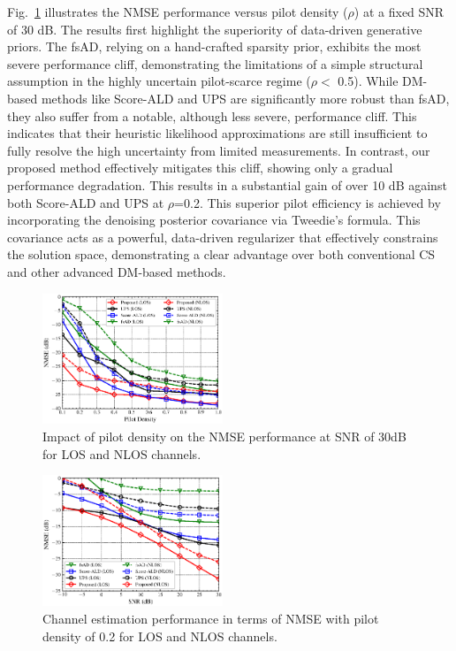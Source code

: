 \documentclass[lettersize,journal]{IEEEtran}
\begin{document}
Fig.~\ref{fig_sim_1} illustrates the NMSE performance versus pilot density ($\rho$) at a fixed SNR of 30 dB. The results first highlight the superiority of data-driven generative priors. The fsAD, relying on a hand-crafted sparsity prior, exhibits the most severe performance cliff, demonstrating the limitations of a simple structural assumption in the highly uncertain pilot-scarce regime ($\rho<$ 0.5).
While DM-based methods like Score-ALD and UPS are significantly more robust than fsAD, they also suffer from a notable, although less severe, performance cliff. This indicates that their heuristic likelihood approximations are still insufficient to fully resolve the high uncertainty from limited measurements.
In contrast, our proposed method effectively mitigates this cliff, showing only a gradual performance degradation. This results in a substantial gain of over 10 dB against both Score-ALD and UPS at $\rho$=0.2. This superior pilot efficiency is achieved by incorporating the denoising posterior covariance via Tweedie's formula. This covariance acts as a powerful, data-driven regularizer that effectively constrains the solution space, demonstrating a clear advantage over both conventional CS and other advanced DM-based methods.

\begin{figure}[!t]
\includegraphics[width=0.48\textwidth]{images/20251014/fig_1.eps}
\caption{Impact of pilot density on the NMSE performance at SNR of 30dB for LOS and NLOS channels.}
\label{fig_sim_1}
\end{figure}

\begin{figure}[!t]
\includegraphics[width=0.48\textwidth]{images/20251014/fig_2.eps}
\caption{Channel estimation performance in terms of NMSE with pilot density of 0.2 for LOS and NLOS channels.}
\label{fig_sim_2}
\end{figure}
\end{document}

